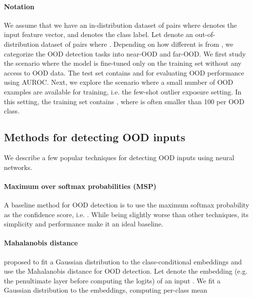 \documentclass{article}
\begin{document}
\vspace{-0.5em}
\paragraph{Notation} 
We assume that we have an in-distribution dataset  of  pairs where  denotes the input feature vector, and  denotes the class label. 
Let  denote an out-of-distribution dataset of  pairs  where . 
Depending on how different   is from , we categorize the OOD detection tasks into near-OOD and far-OOD.
We first study the scenario where the model is fine-tuned only on the training set   without any access to OOD data. The test set contains  and  for evaluating OOD performance using AUROC.
Next, we explore the scenario where a small number of OOD examples are available for training, i.e. the few-shot outlier exposure setting. 
In this setting, the training set contains , where  is often smaller than 100 per OOD class.
\vspace{-0.5em}
\subsection{Methods for detecting OOD inputs}
\vspace{-0.5em}
We describe a few popular techniques for detecting OOD inputs using neural networks.
\vspace{-0.5em}
\paragraph{Maximum over softmax  probabilities (MSP)}
A baseline method for OOD detection is to use the maximum softmax probability as the confidence score, i.e.  \citep{hendrycks2016baseline}. 
While being slightly worse than other techniques, its simplicity and performance make it an ideal baseline.
\vspace{-0.5em}





\paragraph{Mahalanobis distance}
\citet{lee2018simple} proposed to fit a Gaussian distribution to the class-conditional embeddings and use the Mahalanobis distance for OOD detection. 
Let  denote the embedding (e.g. the penultimate layer before computing the logits) of an input .
We fit a Gaussian distribution to the embeddings, computing per-class mean 
\end{document}
